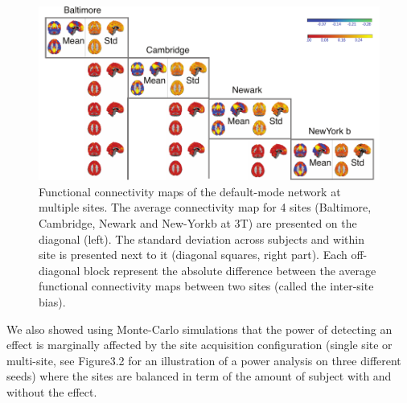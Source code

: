 \documentclass[authoryear]{elsarticle}
\begin{document}
\begin{figure}[H]
\begin{center}
\includegraphics[width=\linewidth]{../figures/mult_center_dm_voxel_seed_3tonly.pdf}
\end{center}
\caption[DMN variability across sites]{
Functional connectivity maps of the default-mode network at multiple sites. The average connectivity map for 4 sites (Baltimore, Cambridge, Newark and New-Yorkb at 3T) are presented on the diagonal (left). The standard deviation across subjects and within site is presented next to it (diagonal squares, right part). Each off-diagonal block represent the absolute difference between the average functional connectivity maps between two sites (called the inter-site bias).
}
\label{fig_DMN_variability}
\end{figure}

We also showed using Monte-Carlo simulations that the power of detecting an effect is marginally affected by the site acquisition configuration (single site or multi-site, see Figure3.2 for an illustration of a power analysis on three different seeds) where the sites are balanced in term of the amount of subject with and without the effect. 
\end{document}
